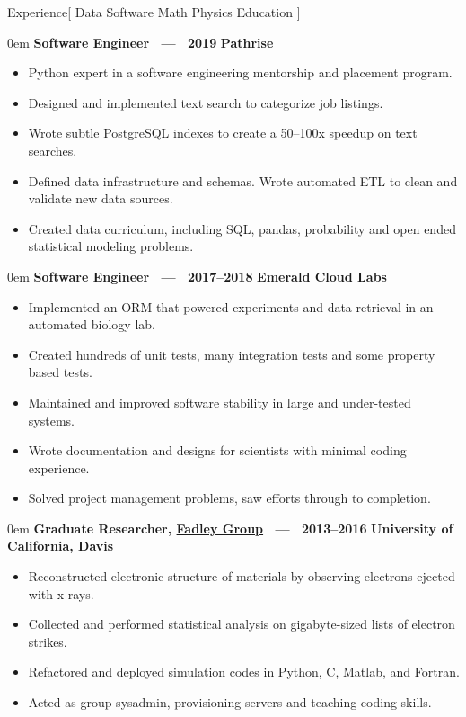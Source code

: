 \documentclass[11pt,a4paper]{article}
\newenvironment{headedsection}[2]{
    \begin{addmargin}[0.5em]{0em}
    {\large\bfseries #1} \hfill {\bfseries #2}%
    \begin{itemize}
        [label={}, topsep=0pt, itemsep=1.5pt, parsep=0pt, leftmargin=1.5em]
}{
    \end{itemize}
    \end{addmargin}
    \medskip
}
\begin{document}
\sloppy  %


\vspace{1em}

\begin{mysection}{Experience}[
    Data
    \textbullet{} Software
    \textbullet{} Math
    \textbullet{} Physics
    \textbullet{} Education
]

    \begin{headedsection}{Software Engineer \ --- \ 2019}{Pathrise}
        \item Python expert in a software engineering mentorship and placement program.
        \item Designed and implemented text search to categorize job listings.
        \item Wrote subtle PostgreSQL indexes to create a 50--100x speedup on text searches.
        \item Defined data infrastructure and schemas.  Wrote automated ETL to clean and validate new data sources.
        \item Created data curriculum, including SQL, pandas, probability and open ended statistical modeling problems.
    \end{headedsection}

    \begin{headedsection}
        {Software Engineer \ --- \ 2017--2018}{Emerald Cloud Labs}

        \item Implemented an ORM that powered experiments and data retrieval in an automated biology lab.
        \item Created hundreds of unit tests, many integration tests and some property based tests.
        \item Maintained and improved software stability in large and under-tested systems.
        \item Wrote documentation and designs for scientists with minimal coding experience.
        \item Solved project management problems, saw efforts through to completion.
    \end{headedsection}

    \begin{headedsection}
          {Graduate Researcher, \href{http://www.physics.ucdavis.edu/fadleygroup/}{Fadley Group}
             \ --- \ 2013--2016}
          {University of California, Davis}

        \item Reconstructed electronic structure of materials by observing electrons ejected with x-rays.
        \item Collected and performed statistical analysis on gigabyte-sized lists of electron strikes.
        \item Refactored and deployed simulation codes in Python, C, Matlab, and Fortran.
        \item Acted as group sysadmin, provisioning servers and teaching coding skills.
    \end{headedsection}

\end{mysection}
\end{document}
